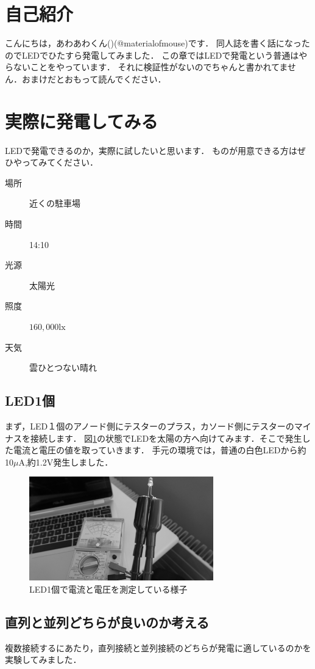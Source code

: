 \section{自己紹介}
こんにちは，あわあわくん()(@materialofmouse)です．
同人誌を書く話になったのでLEDでひたすら発電してみました．
この章ではLEDで発電という普通はやらないことをやっています．
それに検証性がないのでちゃんと書かれてません．おまけだとおもって読んでください．

\section{実際に発電してみる}
LEDで発電できるのか，実際に試したいと思います．
ものが用意できる方はぜひやってみてください．

\begin{description}
  \item[場所]{近くの駐車場}
  \item[時間]{14:10}
  \item[光源]{太陽光}
  \item[照度]{$160,000\si\lux$}
  \item[天気]{雲ひとつない晴れ}
\end{description}


\subsection{LED1個}
まず，LED１個のアノード側にテスターのプラス，カソード側にテスターのマイナスを接続します．
図\ref{fig:led1}の状態でLEDを太陽の方へ向けてみます．そこで発生した電流と電圧の値を取っていきます．
手元の環境では，普通の白色LEDから約10$\mu\si\ampere$,約1.2$\si\volt$発生しました．

\begin{figure}[htbp]
    \centering
    \includegraphics[width=80mm]{./assets/mouse/gray/1.JPG}
    \caption{LED1個で電流と電圧を測定している様子}
    \label{fig:led1}
\end{figure}

\subsection{直列と並列どちらが良いのか考える}
複数接続するにあたり，直列接続と並列接続のどちらが発電に適しているのかを実験してみました．

